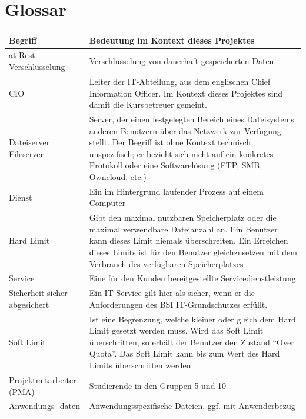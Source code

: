 \section{Glossar}
\begin{center}
\begin{longtable}{p{3.2cm}p{12cm}}
\toprule
Begriff & Bedeutung im Kontext dieses Projektes \\
\midrule
at Rest Verschlüsselung & Verschlüsselung von dauerhaft gespeicherten Daten \\
\midrule
CIO & Leiter der IT-Abteilung, aus dem englischen Chief Information Officer. Im Kontext dieses Projektes sind damit die Kursbetreuer gemeint. \\
\midrule
Dateiserver \newline Fileserver & Server, der einen festgelegten Bereich eines Dateisystems anderen Benutzern über das Netzwerk zur Verfügung stellt. Der Begriff ist ohne Kontext technisch unspezifisch; er bezieht sich nicht auf ein konkretes Protokoll oder eine Softwarelösung (FTP, SMB, Owncloud, etc.) \\
\midrule
Dienst & Ein im Hintergrund laufender Prozess auf einem Computer \\
\midrule
Hard Limit & Gibt den maximal nutzbaren Speicherplatz oder die maximal verwendbare Dateianzahl an. Ein Benutzer kann dieses Limit niemals überschreiten. Ein Erreichen dieses Limits ist für den Benutzer gleichzusetzen mit dem Verbrauch des verfügbaren Speicherplatzes \\
\midrule
Service & Eine für den Kunden bereitgestellte Servicedienstleistung \\
\midrule
Sicherheit \newline sicher \newline abgesichert & Ein IT Service gilt hier als sicher, wenn er die Anforderungen des BSI IT-Grundschutzes erfüllt. \\
\midrule
Soft Limit & Ist eine Begrenzung, welche kleiner oder gleich dem Hard Limit gesetzt werden muss. Wird das Soft Limit überschritten, so erhält der Benutzer den Zustand ``Over Quota''. Das Soft Limit kann bis zum Wert des Hard Limits überschritten werden \\
\midrule
Projektmitarbeiter \newline (PMA) & Studierende in den Gruppen 5 und 10 \\
\midrule
Anwendungs- \newline daten & Anwendungsspezifische Dateien, ggf. mit Anwenderbezug \\

\end{longtable}
\end{center}
